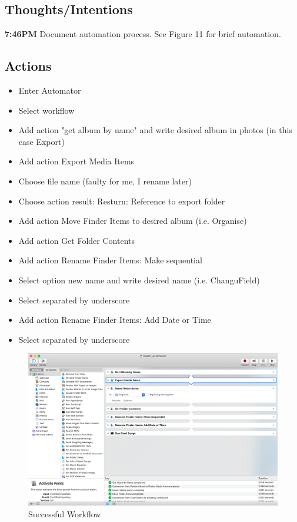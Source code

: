 \documentclass{article}
\begin{document}
\subsection{Thoughts/Intentions}
\textbf{7:46PM} Document automation process. See Figure 11 for brief automation.

\subsection{Actions}
\begin{itemize}
\item Enter Automator
\item Select workflow
\item Add action "get album by name" and write desired album in photos (in this case Export)
\item Add action Export Media Items
\item Choose file name (faulty for me, I rename later)
\item Choose action result: Resturn: Reference to export folder
\item Add action Move Finder Items to desired album (i.e. Organise)
\item Add action Get Folder Contents
\item Add action Rename Finder Items: Make sequential
\item Select option new name and write desired name (i.e. ChanguField)
\item Select separated by underscore
\item Add action Rename Finder Items: Add Date or Time
\item Select separated by underscore
\end{itemize}

\begin{figure}[H]
    \centering
    \includegraphics[width=\textwidth]{Images/Automator_4.png}
    \caption{Successful Workflow}
    \label{fig:my_label}
\end{figure}
\end{document}

